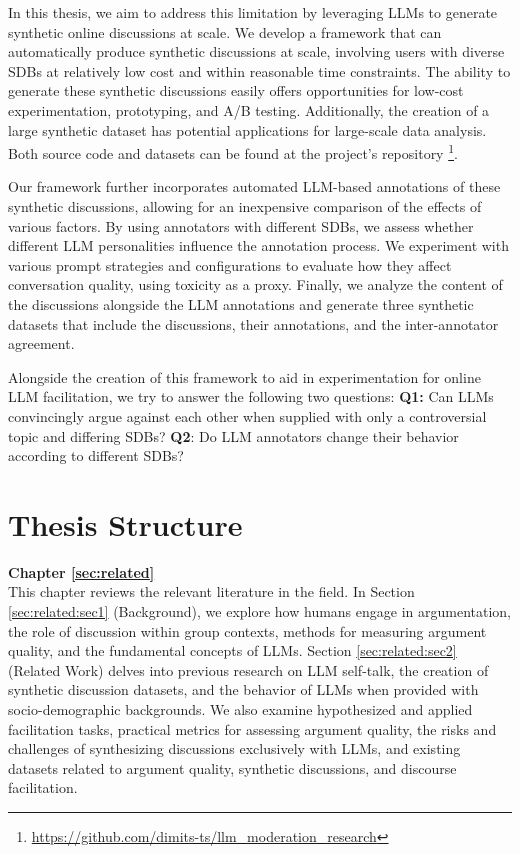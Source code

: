 In this thesis, we aim to address this limitation by leveraging \acp{LLM} to generate synthetic online discussions at scale. We develop a framework that can automatically produce synthetic discussions at scale, involving users with diverse \acp{SDB} at relatively low cost and within reasonable time constraints. The ability to generate these synthetic discussions easily offers opportunities for low-cost experimentation, prototyping, and A/B testing. Additionally, the creation of a large synthetic dataset has potential applications for large-scale data analysis. Both source code and datasets can be found at the project's repository \footnote{\url{https://github.com/dimits-ts/llm_moderation_research}}.

Our framework further incorporates automated LLM-based annotations of these synthetic discussions, allowing for an inexpensive comparison of the effects of various factors. By using annotators with different \acp{SDB}, we assess whether different LLM personalities influence the annotation process. We experiment with various prompt strategies and configurations to evaluate how they affect conversation quality, using toxicity as a proxy. Finally, we analyze the content of the discussions alongside the LLM annotations and generate three synthetic datasets that include the discussions, their annotations, and the inter-annotator agreement.

Alongside the creation of this framework to aid in experimentation for online LLM facilitation, we try to answer the following two questions: \textbf{Q1:} Can LLMs convincingly argue against each other when supplied with only a controversial topic and differing \acp{SDB}? \textbf{Q2}: Do LLM annotators change their behavior according to different \acp{SDB}?

\section{Thesis Structure}
\label{sec:intro:structure}

\textbf{Chapter \ref{sec:related}} \\[0.2em]

This chapter reviews the relevant literature in the field. In Section \ref{sec:related:sec1} (Background), we explore how humans engage in argumentation, the role of discussion within group contexts, methods for measuring argument quality, and the fundamental concepts of \acp{LLM}. Section \ref{sec:related:sec2} (Related Work) delves into previous research on LLM self-talk, the creation of synthetic discussion datasets, and the behavior of LLMs when provided with socio-demographic backgrounds. We also examine hypothesized and applied facilitation tasks, practical metrics for assessing argument quality, the risks and challenges of synthesizing discussions exclusively with LLMs, and existing datasets related to argument quality, synthetic discussions, and discourse facilitation.


